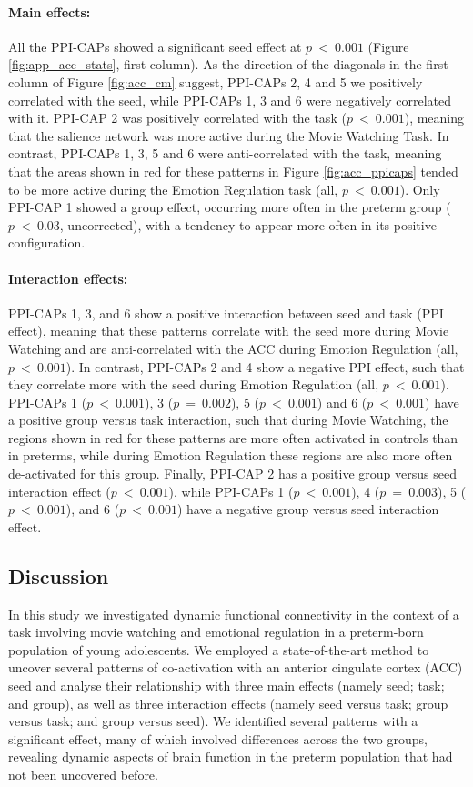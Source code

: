\paragraph{Main effects:}
All the PPI-CAPs showed a significant seed effect at $p~<~0.001$ (Figure \ref{fig:app_acc_stats}, first column). As the direction of the diagonals in the first column of Figure \ref{fig:acc_cm} suggest, PPI-CAPs 2, 4 and 5 we positively correlated with the seed, while PPI-CAPs 1, 3 and 6 were negatively correlated with it. PPI-CAP 2 was positively correlated with the task ($p~<~0.001$), meaning that the salience network was more active during the Movie Watching Task. In contrast, PPI-CAPs 1, 3, 5 and 6 were anti-correlated with the task, meaning that the areas shown in red for these patterns in Figure \ref{fig:acc_ppicaps} tended to be more active during the Emotion Regulation task (all, $p~<~0.001$). Only PPI-CAP 1 showed a group effect, occurring more often in the preterm group ( $p~<~0.03$, uncorrected), with a tendency to appear more often in its positive configuration.

\paragraph{Interaction effects:}
PPI-CAPs 1, 3, and 6 show  a positive interaction between seed and task (PPI effect), meaning that these patterns correlate with the seed more during Movie Watching and are anti-correlated with the ACC during  Emotion Regulation (all, $p~<~0.001$). In contrast, PPI-CAPs 2 and 4 show a negative PPI effect, such that they correlate more with the seed during Emotion Regulation (all, $p~<~0.001$). PPI-CAPs 1 ($p~<~0.001$), 3 ($p~=~0.002$), 5 ($p~<~0.001$) and 6 ($p~<~0.001$) have a positive group versus task interaction, such that during Movie Watching, the regions shown in red for these patterns are more often activated in controls than in preterms, while during Emotion Regulation these regions are also more often de-activated for this group. Finally, PPI-CAP 2 has a positive group versus seed interaction effect ($p~<~0.001$), while PPI-CAPs 1 ($p~<~0.001$), 4 ($p~=~0.003$), 5 ($p~<~0.001$), and 6 ($p~<~0.001$) have a negative group versus seed interaction effect.






\subsection{Discussion}
In this study we investigated dynamic functional connectivity in the context of a task involving movie watching and emotional regulation in a preterm-born population of young adolescents. We employed a state-of-the-art method to uncover several patterns of co-activation with an anterior cingulate cortex (ACC) seed and analyse their relationship with three main effects (namely seed; task; and group), as well as three interaction effects (namely seed versus task; group versus task; and group versus seed). We identified several patterns with a significant effect, many of which involved differences across the two groups, revealing dynamic aspects of brain function in the preterm population that had not been uncovered before. 

